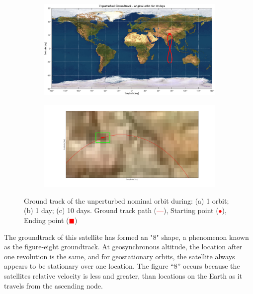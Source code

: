 \documentclass{article}
\newcommand{\reddashedline}{\textcolor{red}{---}}
\begin{document}
\begin{figure}[H]
	\vspace{1cm} %
	\begin{subfigure}[b]{0.45\textwidth}
		\includegraphics[width=\textwidth]{ug10d.eps}
		\caption{}
		\label{fig:1c}
	\end{subfigure}
	\hfill
	\begin{subfigure}[b]{0.45\textwidth}
		\includegraphics[width=\textwidth]{ugstartend.png}
		\caption{}
		\label{fig:1d}
	\end{subfigure}
	\caption{Ground track of the unperturbed nominal orbit during: (a) 1 orbit; (b) 1 day; (c) 10 days. Ground track path (\reddashedline), Starting point (\textcolor{red}{$\bullet$}), Ending point (\textcolor{red}{$\blacksquare$})
	}
\end{figure}


The groundtrack of this satellite has formed an "8" shape, a phenomenon known as the figure-eight groundtrack. At geosynchronous altitude, the location after one revolution is the same, and for geostationary  orbits, the satellite always appears to be stationary over one location. The figure “8” occurs because the satellites relative velocity is less and greater, than locations on the Earth as it travels from the ascending node. 
\end{document}
